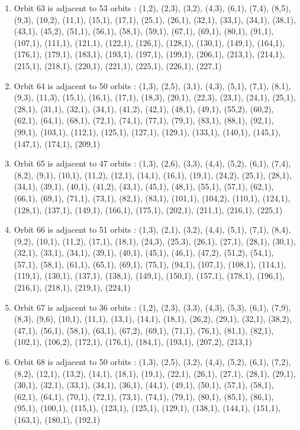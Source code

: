 \documentclass[12pt]{article}
\begin{document}
\begin{enumerate}
\item Orbit 63 is adjacent to 53 orbits : (1,2), (2,3), (3,2), (4,3), (6,1), (7,4), (8,5), (9,3), (10,2), (11,1), (15,1), (17,1), (25,1), (26,1), (32,1), (33,1), (34,1), (38,1), (43,1), (45,2), (51,1), (56,1), (58,1), (59,1), (67,1), (69,1), (80,1), (91,1), (107,1), (111,1), (121,1), (122,1), (126,1), (128,1), (130,1), (149,1), (164,1), (176,1), (179,1), (183,1), (193,1), (197,1), (199,1), (206,1), (213,1), (214,1), (215,1), (218,1), (220,1), (221,1), (225,1), (226,1), (227,1)
\item Orbit 64 is adjacent to 50 orbits : (1,3), (2,5), (3,1), (4,3), (5,1), (7,1), (8,1), (9,3), (11,3), (15,1), (16,1), (17,1), (18,3), (20,1), (22,3), (23,1), (24,1), (25,1), (28,1), (31,1), (32,1), (34,1), (41,2), (42,1), (48,1), (49,1), (55,2), (60,2), (62,1), (64,1), (68,1), (72,1), (74,1), (77,1), (79,1), (83,1), (88,1), (92,1), (99,1), (103,1), (112,1), (125,1), (127,1), (129,1), (133,1), (140,1), (145,1), (147,1), (174,1), (209,1)
\item Orbit 65 is adjacent to 47 orbits : (1,3), (2,6), (3,3), (4,4), (5,2), (6,1), (7,4), (8,2), (9,1), (10,1), (11,2), (12,1), (14,1), (16,1), (19,1), (24,2), (25,1), (28,1), (34,1), (39,1), (40,1), (41,2), (43,1), (45,1), (48,1), (55,1), (57,1), (62,1), (66,1), (69,1), (71,1), (73,1), (82,1), (83,1), (101,1), (104,2), (110,1), (124,1), (128,1), (137,1), (149,1), (166,1), (175,1), (202,1), (211,1), (216,1), (225,1)
\item Orbit 66 is adjacent to 51 orbits : (1,3), (2,1), (3,2), (4,4), (5,1), (7,1), (8,4), (9,2), (10,1), (11,2), (17,1), (18,1), (24,3), (25,3), (26,1), (27,1), (28,1), (30,1), (32,1), (33,1), (34,1), (39,1), (40,1), (45,1), (46,1), (47,2), (51,2), (54,1), (57,1), (58,1), (61,1), (65,1), (69,1), (75,1), (94,1), (107,1), (108,1), (114,1), (119,1), (130,1), (137,1), (138,1), (149,1), (150,1), (157,1), (178,1), (196,1), (216,1), (218,1), (219,1), (224,1)
\item Orbit 67 is adjacent to 36 orbits : (1,2), (2,3), (3,3), (4,3), (5,3), (6,1), (7,9), (8,3), (9,6), (10,1), (11,1), (13,1), (14,1), (18,1), (26,2), (29,1), (32,1), (38,2), (47,1), (56,1), (58,1), (63,1), (67,2), (69,1), (71,1), (76,1), (81,1), (82,1), (102,1), (106,2), (172,1), (176,1), (184,1), (193,1), (207,2), (213,1)
\item Orbit 68 is adjacent to 50 orbits : (1,3), (2,5), (3,2), (4,4), (5,2), (6,1), (7,2), (8,2), (12,1), (13,2), (14,1), (18,1), (19,1), (22,1), (26,1), (27,1), (28,1), (29,1), (30,1), (32,1), (33,1), (34,1), (36,1), (44,1), (49,1), (50,1), (57,1), (58,1), (62,1), (64,1), (70,1), (72,1), (73,1), (74,1), (79,1), (80,1), (85,1), (86,1), (95,1), (100,1), (115,1), (123,1), (125,1), (129,1), (138,1), (144,1), (151,1), (163,1), (180,1), (192,1)

\end{enumerate}
\end{document}
